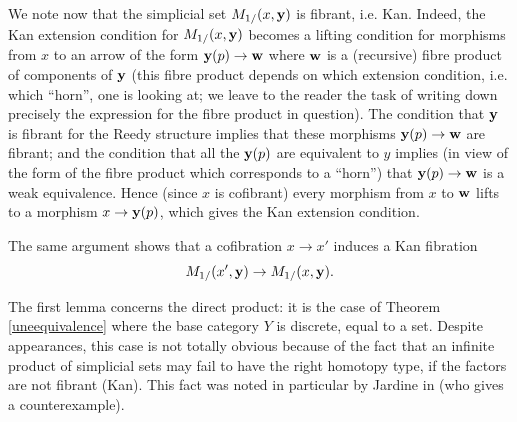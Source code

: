 We note now that the simplicial set $M_{1/}(x, {\bf y})$ is
fibrant, i.e. Kan. Indeed, the Kan extension condition for
$M_{1/}(x, {\bf y})$ becomes a lifting condition for morphisms
from $x$ to an arrow of the form ${\bf y}(p)\rightarrow {\bf w}$ where
${\bf w}$ is a (recursive) fibre product of components of ${\bf y}$ (this
fibre product depends on which extension condition, i.e. which
``horn'', one is
looking at; we leave to the reader the task of writing down precisely the
expression for the
fibre product in question). The condition that ${\bf y}$ is fibrant for the
Reedy structure implies that these morphisms ${\bf y}(p)\rightarrow {\bf w}$
are fibrant; and the condition that all the ${\bf y}(p)$ are equivalent to
$y$ implies (in view of the form of the fibre product which corresponds to a
``horn'') that ${\bf y}(p)\rightarrow {\bf w}$ is a weak equivalence.
Hence (since $x$ is cofibrant) every morphism from $x$ to ${\bf w}$ lifts to
a morphism $x\rightarrow {\bf y}(p)$, which gives the Kan extension
condition.

The same argument shows that a cofibration $x\rightarrow x'$ induces a
Kan fibration
$$
M_{1/}(x', {\bf y})\rightarrow M_{1/}(x, {\bf y}).
$$


The first lemma concerns the direct product: it is the case of Theorem
\ref{uneequivalence} where the base category $Y$ is discrete, equal
to a set. Despite
appearances, this case is not totally obvious
because of the fact that an infinite product of simplicial sets may fail to
have the right homotopy type, if the factors are not fibrant (Kan). This fact
was noted in particular by Jardine in \cite{JardineBool} (who gives a
counterexample).

